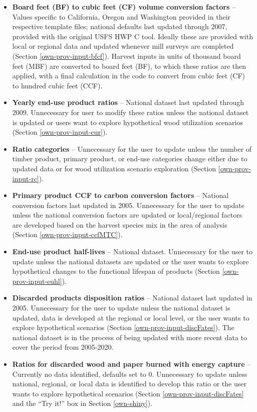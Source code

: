 \documentclass[
  openany]{book}
\begin{document}
\begin{itemize}
\item
  \textbf{Board feet (BF) to cubic feet (CF) volume conversion factors} -- Values specific to California, Oregon and Washington provided in their respective template files; national defaults last updated through 2007, provided with the original USFS HWP C tool. Ideally these are provided with local or regional data and updated whenever mill surveys are completed (Section \ref{own-prov-input-bfcf}). Harvest inputs in units of thousand board feet (MBF) are converted to board feet (BF), to which these ratios are then applied, with a final calculation in the code to convert from cubic feet (CF) to hundred cubic feet (CCF).
\item
  \textbf{Yearly end-use product ratios} -- National dataset last updated through 2009. Unnecessary for user to modify these ratios unless the national dataset is updated or users want to explore hypothetical wood utilization scenarios (Section \ref{own-prov-input-eur}).
\item
  \textbf{Ratio categories} -- Unnecessary for the user to update unless the number of timber product, primary product, or end-use categories change either due to updated data or for wood utilization scenario exploration (Section \ref{own-prov-input-rc}).
\item
  \textbf{Primary product CCF to carbon conversion factors} -- National conversion factors last updated in 2005. Unnecessary for the user to update unless the national conversion factors are updated or local/regional factors are developed based on the harvest species mix in the area of analysis (Section \ref{own-prov-input-ccfMTC}).
\item
  \textbf{End-use product half-lives} -- National dataset. Unnecessary for the user to update unless the national datasets are updated or the user wants to explore hypothetical changes to the functional lifespan of products (Section \ref{own-prov-input-euhl}).
\item
  \textbf{Discarded products disposition ratios} -- National dataset last updated in 2005. Unnecessary for the user to update unless the national dataset is updated, data is developed at the regional or local level, or the user wants to explore hypothetical scenarios (Section \ref{own-prov-input-discFates}). The national dataset is in the process of being updated with more recent data \autocite{usepa2020} to cover the period from 2005-2020.
\item
  \textbf{Ratios for discarded wood and paper burned with energy capture} -- Currently no data identified, defaults set to 0. Unnecessary to update unless national, regional, or local data is identified to develop this ratio or the user wants to explore hypothetical scenarios (Section \ref{own-prov-input-discFates} and the ``Try it!'' box in Section \ref{own-shiny}).

\end{itemize}
\end{document}
